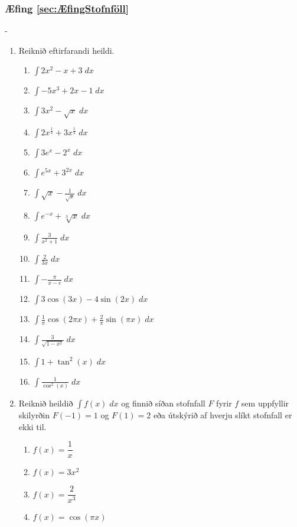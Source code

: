 \subsubsection*{Æfing \ref{sec:ÆfingStofnföll}}
\begin{adjustwidth}{-\hangingaefingar}{}
\begin{enumerate}

\item Reiknið eftirfarandi heildi.
\begin{multicols}{2}
\begin{enumerate}
\setlength\itemsep{4mm}
\item $\displaystyle \int 2x^{2}-x+3 \; dx$
\item $\displaystyle \int -5x^{3}+2x-1 \; dx$
\item $\displaystyle \int 3x^{2}-\sqrt{x} \; dx$
\item $\displaystyle \int 2x^{\tfrac{1}{3}}+3x^{\tfrac{1}{2}} \; dx$
\item $\displaystyle \int 3e^{x}-2^{x} \; dx$
\item $\displaystyle \int e^{5x}+3^{2x} \; dx$
\item $\displaystyle \int \sqrt{x}-\frac{1}{\sqrt{x}} \; dx$
\item $\displaystyle \int e^{-x}+\sqrt[3]{x} \; dx$
\item $\displaystyle \int \frac{3}{x^{2}+1} \; dx$
\item $\displaystyle \int \frac{2}{3x} \; dx$
\item $\displaystyle \int -\frac{\pi}{x-e} \; dx$
\item $\displaystyle \int 3\cos(3x)-4\sin(2x) \; dx$
\item $\displaystyle \int \frac{1}{\pi}\cos(2\pi x)+\frac{2}{\pi}\sin(\pi x) \; dx$
\item $\displaystyle \int \frac{3}{\sqrt{1-x^{2}}} \; dx$
\item $\displaystyle \int 1 + \tan^{2}(x) \; dx$
\item $\displaystyle \int \frac{1}{\cos^{2}(x)} \; dx$
\end{enumerate}
\end{multicols}

\item Reiknið heildið $\displaystyle \int f(x) \; dx$ og finnið síðan stofnfall $F$ fyrir $f$ sem uppfyllir skilyrðin $F(-1) = 1$ og $F(1) = 2$ eða útskýrið af hverju slíkt stofnfall er ekki til.
\begin{multicols}{2}
\begin{enumerate}
\setlength\itemsep{4mm}
\item $f(x) = \dfrac{1}{x}$
\item $f(x) = 3x^{2}$
\item $f(x) = \dfrac{2}{x^{3}}$
\item $f(x) = \cos(\pi x)$
\end{enumerate}
\end{multicols}


\end{enumerate}
\end{adjustwidth}
